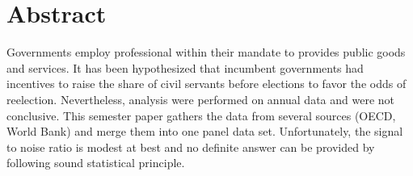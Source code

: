 \chapter*{Abstract}

Governments employ professional within their mandate to provides public goods
and services. It has been hypothesized that incumbent governments had
incentives to raise the share of civil servants before elections to favor the
odds of reelection. Nevertheless, analysis were performed on annual data and
were not conclusive. This semester paper gathers the data from several sources
(OECD, World Bank) and merge them into one panel data set. Unfortunately, the
signal to noise ratio is modest at best and no definite answer can be provided
by following sound statistical principle.


